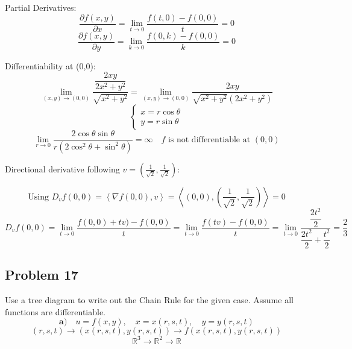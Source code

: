 \documentclass[11pt]{article}
\newcommand{\inner}[2]{\left\langle #1, #2 \right\rangle}
\begin{document}
Partial Derivatives: $$ \frac{\partial f(x,y)}{\partial x} = \lim_{t \to 0} \frac{f(t,0) - f(0,0)}{t} = 0 $$ $$ \frac{\partial f(x,y)}{\partial y} = \lim_{k \to 0} \frac{f(0,k) - f(0,0)}{k} = 0 $$

Differentiability at (0,0): $$ \lim_{(x,y) \to (0,0)} \frac{\dfrac{2xy}{2x^2 + y^2}}{\sqrt{x^2 + y^2}} = \lim_{(x,y) \to (0,0)} \frac{2xy}{\sqrt{x^2 + y^2} \left(2x^2 + y^2\right)} $$ $$ \begin{cases}x = r \cos \theta \\ y = r \sin \theta \end{cases}$$ $$ \lim_{r \to 0} \frac{2 \cos \theta \sin \theta}{r \left(2 \cos^2 \theta + \sin^2 \theta\right)} = \infty \quad f \text{ is not differentiable at } (0,0) $$

Directional derivative following $v = \left(\frac{1}{\sqrt{2}}, \frac{1}{\sqrt{2}}\right)$:

$$ \text{Using } D_v f(0, 0) = \inner{\nabla f(0, 0)}{v} = \inner{\left(0, 0\right)}{\left(\frac{1}{\sqrt{2}}, \frac{1}{\sqrt{2}}\right)} = 0 $$
$$ D_v f(0, 0) = \lim_{t \to 0} \frac{f(0, 0) + tv) - f(0, 0)}{t} = \lim_{t \to 0} \frac{f(tv) - f(0, 0)}{t} = \lim_{t \to 0} \frac{\dfrac{2t^2}{2}}{\dfrac{2t^2}{2} + \dfrac{t^2}{2}} = \frac{2}{3} $$


\subsection*{Problem 17}
Use a tree diagram to write out the Chain Rule for the given case. Assume all functions
are differentiable.
\[
\mathbf{a)} \quad u = f(x, y), \quad x = x(r, s, t), \quad y = y(r, s, t)
\]
\[
(r, s, t) \rightarrow (x(r, s, t), y(r, s, t)) \rightarrow f(x(r, s, t), y(r, s, t))
\]
\[
\mathbb{R}^3 \rightarrow \mathbb{R}^2 \rightarrow \mathbb{R}
\]
\end{document}
